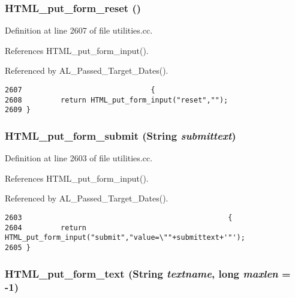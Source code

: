 \subsubsection{ HTML\_\-put\_\-form\_\-reset ()}\label{utilities_8cc_a73}




Definition at line 2607 of file utilities.cc.

References HTML\_\-put\_\-form\_\-input().

Referenced by AL\_\-Passed\_\-Target\_\-Dates().



\footnotesize\begin{verbatim}2607                              {
2608         return HTML_put_form_input("reset","");
2609 }
\end{verbatim}\normalsize 
{}
\subsubsection{ HTML\_\-put\_\-form\_\-submit ({\bf String} {\em submittext})}\label{utilities_8cc_a72}




Definition at line 2603 of file utilities.cc.

References HTML\_\-put\_\-form\_\-input().

Referenced by AL\_\-Passed\_\-Target\_\-Dates().



\footnotesize\begin{verbatim}2603                                                {
2604         return HTML_put_form_input("submit","value=\""+submittext+'"');
2605 }
\end{verbatim}\normalsize 
{}
\subsubsection{ HTML\_\-put\_\-form\_\-text ({\bf String} {\em textname}, long {\em maxlen} = -1)}\label{utilities_8cc_a77}




